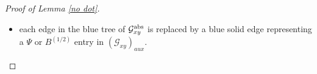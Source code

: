 \documentclass{article}
\newcommand{\1}{\mathds{1}}
\numberwithin{equation}{section}
\newcommand{\ord}{{\rm{ord}}}
\newcommand{\al}{\alpha}
\newcommand{\be}{\begin{equation}}
\newcommand{\ee}{\end{equation}}
\newcommand{\e}{{\varepsilon}}
\renewcommand{\cal}{\mathcal}
\newcommand{\wt}{\widetilde}
\renewcommand{\leq}{\leqslant}
\renewcommand{\le}{\leq}
\newcommand{\dashed}{\text{diffusive}}
\newcommand{\abs}{{\rm abs}}%
\DeclareMathOperator{\OO}{O}
\theoremstyle{plain} %
\theoremstyle{remark}
\begin{document}
\begin{proof} [Proof of Lemma \ref{no dot}]
\begin{itemize}
\item each edge in the blue tree of $\cal G_{xy}^{\abs}$ is replaced by a blue solid edge representing %
a $\Psi$ or $B^{(1/2)}$ entry in $(\cal G_{xy})_{aux}$.
\end{itemize}



\end{proof}
\end{document}

